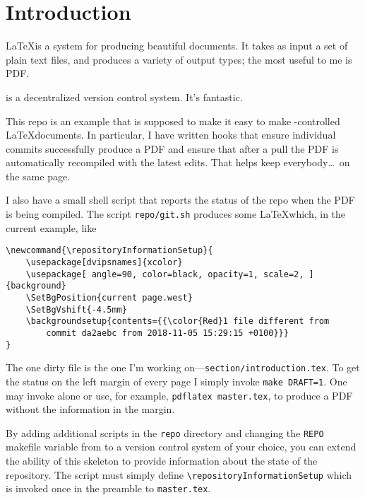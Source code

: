 \section{Introduction}

\LaTeX is a system for producing beautiful documents.
It takes as input a set of plain text files, and produces a variety of output types; the most useful to me is PDF.

\git is a decentralized version control system.
It's fantastic.

This repo\cite{latex-base} is an example that is supposed to make it easy to make \git-controlled \LaTeX documents.
In particular, I have written \git hooks that ensure individual commits successfully produce a PDF and ensure that after a pull the PDF is automatically recompiled with the latest edits.
That helps keep everybody\ldots\ on the same page.

I also have a small shell script that reports the status of the repo when the PDF is being compiled.
The script \texttt{repo/git.sh} produces some \LaTeX which, in the current example, like
\begin{verbatim}
\newcommand{\repositoryInformationSetup}{
    \usepackage[dvipsnames]{xcolor}
    \usepackage[ angle=90, color=black, opacity=1, scale=2, ]{background}
    \SetBgPosition{current page.west}
    \SetBgVshift{-4.5mm}
    \backgroundsetup{contents={{\color{Red}1 file different from 
        commit da2aebc from 2018-11-05 15:29:15 +0100}}}
}\end{verbatim}
The one dirty file is the one I'm working on---\texttt{section/introduction.tex}.
To get the \git status on the left margin of every page I simply invoke \texttt{make DRAFT=1}.
One may invoke \make alone or use, for example, \texttt{pdflatex master.tex}, to produce a PDF without the \git information in the margin.

By adding additional scripts in the \texttt{repo} directory and changing the \texttt{REPO} makefile variable from \git to a version control system of your choice, you can extend the ability of this skeleton to provide information about the state of the repository.
The script must simply define \texttt{{\textbackslash}repositoryInformationSetup} which is invoked once in the preamble to \texttt{master.tex}.
